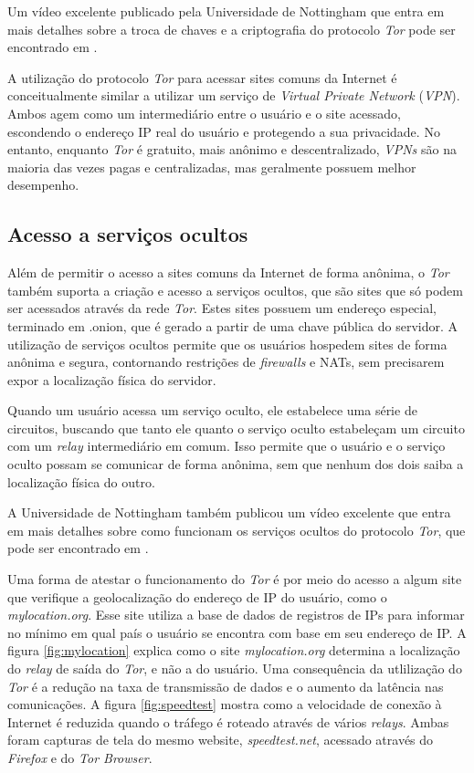 Um vídeo excelente publicado pela Universidade de Nottingham que entra em mais detalhes sobre a troca de chaves e a criptografia do protocolo \textit{Tor} pode ser encontrado em \cite{computerphile-tor}.

A utilização do protocolo \textit{Tor} para acessar sites comuns da Internet é conceitualmente similar a utilizar um serviço de \textit{Virtual Private Network} (\textit{VPN}). Ambos agem como um intermediário entre o usuário e o site acessado, escondendo o endereço IP real do usuário e protegendo a sua privacidade. No entanto, enquanto \textit{Tor} é gratuito, mais anônimo e descentralizado, \textit{VPNs} são na maioria das vezes pagas e centralizadas, mas geralmente possuem melhor desempenho.

\subsection{Acesso a serviços ocultos}

Além de permitir o acesso a sites comuns da Internet de forma anônima, o \textit{Tor} também suporta a criação e acesso a serviços ocultos, que são sites que só podem ser acessados através da rede \textit{Tor}. Estes sites possuem um endereço especial, terminado em .onion, que é gerado a partir de uma chave pública do servidor. A utilização de serviços ocultos permite que os usuários hospedem sites de forma anônima e segura, contornando restrições de \textit{firewalls} e NATs, sem precisarem expor a localização física do servidor.

Quando um usuário acessa um serviço oculto, ele estabelece uma série de circuitos, buscando que tanto ele quanto o serviço oculto estabeleçam um circuito com um \textit{relay} intermediário em comum. Isso permite que o usuário e o serviço oculto possam se comunicar de forma anônima, sem que nenhum dos dois saiba a localização física do outro.

A Universidade de Nottingham também publicou um vídeo excelente que entra em mais detalhes sobre como funcionam os serviços ocultos do protocolo \textit{Tor}, que pode ser encontrado em \cite{computerphile-hidden-services}.

Uma forma de atestar o funcionamento do \textit{Tor} é por meio do acesso a algum site que verifique a geolocalização do endereço de IP do usuário, como o \textit{mylocation.org}. Esse site utiliza a base de dados de registros de IPs para informar no mínimo em qual país o usuário se encontra com base em seu endereço de IP. A figura \ref{fig:mylocation} explica como o site \textit{mylocation.org} determina a localização do \textit{relay} de saída do \textit{Tor}, e não a do usuário. Uma consequência da utlilização do \textit{Tor} é a redução na taxa de transmissão de dados e o aumento da latência nas comunicações. A figura \ref{fig:speedtest} mostra como a velocidade de conexão à Internet é reduzida quando o tráfego é roteado através de vários \textit{relays}. Ambas foram capturas de tela do mesmo website, \textit{speedtest.net}, acessado através do \textit{Firefox} e do \textit{Tor Browser}.


